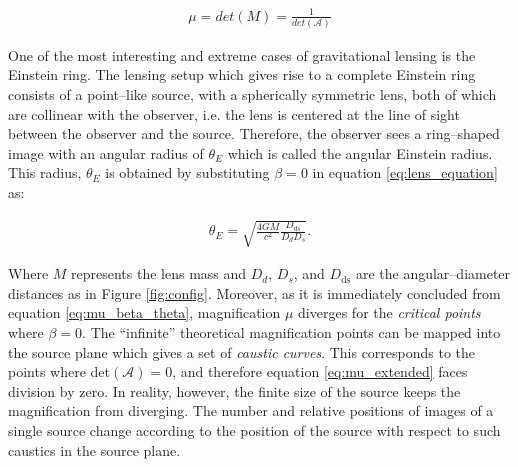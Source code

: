 \documentclass[a4wide,12pt]{book}
\begin{document}
\begin{eqnarray}
\label{eq:mu_extended}
\mu = det(M) = \frac{1}{det(\mathcal{A})}
\end{eqnarray}

One of the most interesting and extreme cases of gravitational lensing is the Einstein ring. The lensing setup which gives rise to a complete Einstein ring consists of a point--like source, with a spherically symmetric lens, both of which are collinear with the observer, i.e. the lens is centered at the line of sight between the observer and the source. Therefore, the observer sees a ring--shaped image with an angular radius of $\theta_E$ which is called the angular Einstein radius. This radius, $\theta_E$ is obtained by substituting $\beta=0$ in equation \ref{eq:lens_equation} as:

\begin{eqnarray}
\theta_E = \sqrt{\frac{4GM}{c^2}\frac{D_{ds}}{D_dD_s}}.
\label{eq:lens}
\end{eqnarray}

 Where $M$ represents the lens mass and $D_d$, $D_s$, and $D_\mathrm{ds}$ are the angular--diameter distances as in Figure \ref{fig:config}. Moreover, as it is immediately concluded from equation \ref{eq:mu_beta_theta}, magnification $\mu$ diverges for the \emph{critical points} where $\beta=0$. The ``infinite'' theoretical magnification points can be mapped into the source plane which gives a set of \emph{caustic curves}. This corresponds to the points where det$(\mathcal{A}) = 0$, and therefore equation \ref{eq:mu_extended} faces division by zero. In reality, however, the finite size of the source keeps the magnification from diverging. The number and relative positions of images of a single source change according to the position of the source with respect to such caustics in the source plane.
\end{document}
